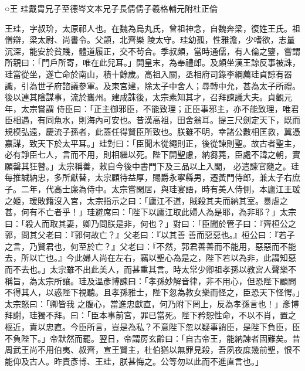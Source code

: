 
\begin{pinyinscope}

 ○王
 珪戴胄兄子至德岑文本兄子長倩倩子羲格輔元附杜正倫



 王珪，字叔玠，太原祁人也。在魏為烏丸氏，曾祖神念，自魏奔梁，復姓王氏。祖僧辯，梁太尉、尚書令。父顗，北齊樂
 陵太守。珪幼孤，性雅澹，少嗜欲，志量沉深，能安於貧賤，體道履正，交不茍合。季叔頗，當時通儒，有人倫之鑒，嘗謂所親曰：「門戶所寄，唯在此兒耳。」開皇末，為奉禮郎。及頗坐漢王諒反事被誅，珪當從坐，遂亡命於南山，積十餘歲。高祖入關，丞相府司錄李綱薦珪貞諒有器識，引為世子府諮議參軍。及東宮建，除太子中舍人；尋轉中允，甚為太子所禮。後以連其陰謀事，流於巂州。建成誅後，太宗素知其才，召拜諫議大夫。貞觀元年，太宗嘗謂
 侍臣曰：「正主御邪臣，不能致理；正臣事邪主，亦不能致理，唯君臣相遇，有同魚水，則海內可安也。昔漢高祖，田舍翁耳。提三尺劍定天下，既而規模弘遠，慶流子孫者，此蓋任得賢臣所致也。朕雖不明，幸諸公數相匡救，冀憑嘉謀，致天下於太平耳。」珪對曰：「臣聞木從繩則正，後從諫則聖。故古者聖主，必有諍臣七人，言而不用，則相繼以死。陛下開聖慮，納芻蕘，臣處不諱之朝，實願罄其狂瞽。」太宗稱善，敕自今後中書門下及三品以上入閣，
 必遣諫官隨之。珪每推誠納忠，多所獻替，太宗顧待益厚，賜爵永寧縣男，遷黃門侍郎，兼太子右庶子。二年，代高士廉為侍中。太宗嘗閑居，與珪宴語，時有美人侍側，本廬江王瑗之姬，瑗敗籍沒入宮，太宗指示之曰：「廬江不道，賊殺其夫而納其室。暴虐之甚，何有不亡者乎！」珪避席曰：「陛下以廬江取此婦人為是耶，為非耶？」太宗曰：「殺人而取其妻，卿乃問朕是非，何也？」對曰：「臣聞於管子曰：『齊桓公之郭，問其父老曰：『郭何故亡？』父老曰：『以其善
 善而惡惡也。』桓公曰：『若子之言，乃賢君也，何至於亡？』父老曰：『不然，郭君善善而不能用，惡惡而不能去，所以亡也。』今此婦人尚在左右，竊以聖心為是之，陛下若以為非，此謂知惡而不去也。」太宗雖不出此美人，而甚重其言。時太常少卿祖孝孫以教宮人聲樂不稱旨，為太宗所讓。珪及溫彥博諫曰：「孝孫妙解音律，非不用心，但恐陛下顧問不得其人，以惑陛下視聽。且孝孫雅士，陛下忽為教女樂而怪之，臣恐天下怪愕。」太宗怒曰：「卿皆我
 之腹心，當進忠獻直，何乃附下罔上，反為孝孫言也！」彥博拜謝，珪獨不拜。曰：「臣本事前宮，罪已當死。陛下矜恕性命，不以不肖，置之樞近，責以忠直。今臣所言，豈是為私？不意陛下忽以疑事誚臣，是陛下負臣，臣不負陛下。」帝默然而罷。翌日，帝謂房玄齡曰：「自古帝王，能納諫者固難矣。昔周武王尚不用伯夷、叔齊，宣王賢主，杜伯猶以無罪見殺，吾夙夜庶幾前聖，恨不能仰及古人。昨責彥博、王珪，朕甚悔之。公等勿以此而不進直言也。」




\end{pinyinscope}
